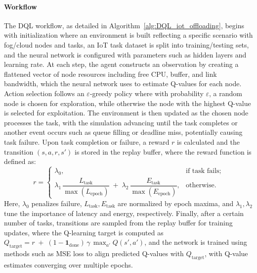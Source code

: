 \documentclass[preprint,3p,authoryear]{elsarticle}
\begin{document}
\paragraph{Workflow}
The DQL workflow, as detailed in Algorithm~\ref{alg:DQL_iot_offloading}, begins with initialization where an environment is built reflecting a specific scenario with fog/cloud nodes and tasks, an IoT task dataset is split into training/testing sets, and the neural network is configured with parameters such as hidden layers and learning rate. At each step, the agent constructs an observation by creating a flattened vector of node resources including free CPU, buffer, and link bandwidth, which the neural network uses to estimate Q-values for each node. Action selection follows an \(\varepsilon\)-greedy policy where with probability \(\varepsilon\), a random node is chosen for exploration, while otherwise the node with the highest Q-value is selected for exploitation. The environment is then updated as the chosen node processes the task, with the simulation advancing until the task completes or another event occurs such as queue filling or deadline miss, potentially causing task failure. Upon task completion or failure, a reward \(r\) is calculated and the transition \((s,a,r,s')\) is stored in the replay buffer, where the reward function is defined as:
\[
\textit{r} = 
\begin{cases}
\lambda_0, & \text{if task fails};\\[4pt]
\lambda_1 \,\dfrac{L_{\text{task}}}{\max(L_{\text{epoch}})} 
\;+\;
\lambda_2 \,\dfrac{E_{\text{task}}}{\max(E_{\text{epoch}})},
& \text{otherwise}.
\end{cases}
\]
Here, \(\lambda_0\) penalizes failure, \(L_{\text{task}}, E_{\text{task}}\) are normalized by epoch maxima, and \(\lambda_1, \lambda_2\) tune the importance of latency and energy, respectively. Finally, after a certain number of tasks, transitions are sampled from the replay buffer for training updates, where the Q-learning target is computed as \(Q_{\text{target}} = r \;+\; (1 - \mathbf{1}_{\text{done}})\,\gamma\, \max_{a'} Q(s',a')\), and the network is trained using methods such as MSE loss to align predicted Q-values with \(Q_{\text{target}}\), with Q-value estimates converging over multiple epochs.
\end{document}
